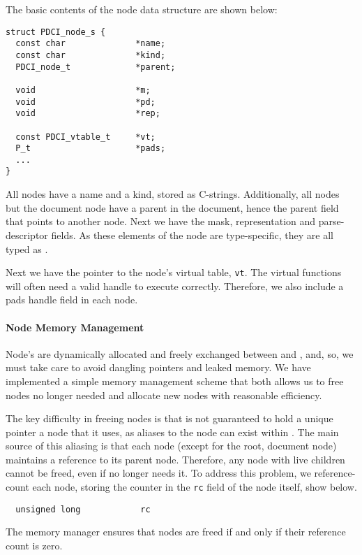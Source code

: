 \documentclass{article}
\begin{document}

The basic contents of the node data structure are shown below:
\begin{verbatim}
struct PDCI_node_s {
  const char              *name;
  const char              *kind;
  PDCI_node_t             *parent;

  void                    *m;
  void                    *pd;
  void                    *rep;

  const PDCI_vtable_t     *vt;
  P_t                     *pads;
  ...
}
\end{verbatim}

All nodes have a name and a kind, stored as C-strings. Additionally,
all nodes but the document node have a parent in the document, hence
the parent field that points to another node. Next we have the mask,
representation and parse-descriptor fields. As these elements of the
node are type-specific, they are all typed as \vptr. 

Next we have the pointer to the node's virtual table, {\tt vt}. The
virtual functions will often need a valid \pads handle to execute
correctly. Therefore, we also include a pads handle field in each
node.

\paragraph{Node Memory Management}

Node's are dynamically allocated and freely exchanged between
\pads and \galax, and, so, we must take care to avoid dangling
pointers and leaked memory. We have implemented a simple memory
management scheme that both allows us to free nodes no longer needed
and allocate new nodes with reasonable efficiency. 

The key difficulty in freeing nodes is that \galax is not guaranteed
to hold a unique pointer a node that it uses, as aliases to the node
can exist within \pads. The main source of this aliasing is that each
node (except for the root, document node) maintains a reference to its
parent node. Therefore, any node with live children cannot be freed,
even if \galax no longer needs it. To address this problem, we
reference-count each node, storing the counter in the {\tt rc} field
of the node itself, show below. 
\begin{verbatim}
  unsigned long            rc
\end{verbatim}
The memory manager ensures that nodes are freed if and only if their
reference count is zero.
\end{document}
